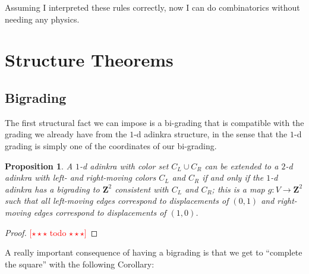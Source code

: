 \documentclass[12pt,twoside,singlespace]{article}
\numberwithin{equation}{section}
\newtheorem{prop}[equation]{Proposition}
\theoremstyle{definition}
\newcommand{\ZZ}{\mathbf{Z}}
\newcommand{\com}[1]{\textcolor{red}{$[\star \star \star$ #1 $\star \star \star]$}}
\begin{document}
Assuming I interpreted these rules correctly, now I can do combinatorics without needing any physics.

\section{Structure Theorems}

\subsection{Bigrading}

The first structural fact we can impose is a bi-grading that is compatible with the grading we already have from the $1$-d adinkra structure, in the sense that the $1$-d grading is simply one of the coordinates of our bi-grading.

\begin{prop}
A $1$-d adinkra with color set $C_L \cup C_R$ can be extended to a $2$-d adinkra with left- and right-moving colors $C_L$ and $C_R$ if and only if the $1$-d adinkra has a \emph{bigrading} to $\ZZ^2$ consistent with $C_L$ and $C_R$; this is a map $g: V \rightarrow \ZZ^2$ such that all left-moving edges correspond to displacements of $(0, 1)$ and right-moving edges correspond to displacements of $(1, 0)$.
\end{prop}

\begin{proof}
\com{todo}
\end{proof}

\begin{comment}
This grading allows us to define the notation $V(A, (x,y))$, which is the set of vertices of $A$ of grading $(x,y) \in \ZZ^2$. We will also use the notation $V(A, r)$ to similarly refer to vertices of $A$ of grading $r \in \ZZ$ when referring to $1$-d adinkras, which will come up in our study. Notice that when we consider a $2$-d adinkra as a $1$-d adinkra, we have the relation
\[
V(A,r) = \cup_{x + y = r} V(A, (x,y)).
\]
\end{comment}

A really important consequence of having a bigrading is that we get to ``complete the square'' with the following Corollary:
\end{document}
